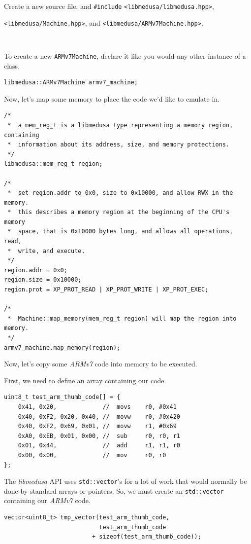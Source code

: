 \documentclass{report}
\begin{document}
	Create a new source file, and \texttt{\#include}
	\texttt{<libmedusa/libmedusa.hpp>}, \

	\texttt{<libmedusa/Machine.hpp>}, and \texttt{<libmedusa/ARMv7Machine.hpp>}.
	\
	
	\

	To create a new \texttt{ARMv7Machine}, declare it like you would any other
	instance of a class.

	\begin{lstlisting}
libmedusa::ARMv7Machine armv7_machine;
	\end{lstlisting}

	Now, let's map some memory to place the code we'd like to emulate in.

	\begin{lstlisting}
/*
 *  a mem_reg_t is a libmedusa type representing a memory region, containing
 *  information about its address, size, and memory protections.
 */
libmedusa::mem_reg_t region;

/*
 *  set region.addr to 0x0, size to 0x10000, and allow RWX in the memory.
 *  this describes a memory region at the beginning of the CPU's memory
 *  space, that is 0x10000 bytes long, and allows all operations, read,
 *  write, and execute.
 */
region.addr = 0x0;
region.size = 0x10000;
region.prot = XP_PROT_READ | XP_PROT_WRITE | XP_PROT_EXEC;

/*
 *  Machine::map_memory(mem_reg_t region) will map the region into memory.
 */
armv7_machine.map_memory(region);
\end{lstlisting}

	Now, let's copy some \textit{ARMv7} code into memory to be executed.

	First, we need to define an array containing our code.

	\begin{lstlisting}
uint8_t test_arm_thumb_code[] = {
	0x41, 0x20,				//	movs	r0,	#0x41
	0x40, 0xF2, 0x20, 0x40,	//	movw	r0,	#0x420
	0x40, 0xF2, 0x69, 0x01,	//	movw	r1,	#0x69
	0xA0, 0xEB, 0x01, 0x00,	//	sub		r0,	r0,	r1
	0x01, 0x44,				//	add		r1,	r1,	r0
	0x00, 0x00,				//  mov		r0,	r0
};
	\end{lstlisting}

	The \textit{libmedusa} API uses \texttt{std::vector}'s for a lot of work
	that would normally be done by standard arrays or pointers. So, we must
	create an \texttt{std::vector} containing our \textit{ARMv7} code.

	\begin{lstlisting}
vector<uint8_t> tmp_vector(test_arm_thumb_code,
						   test_arm_thumb_code
						 + sizeof(test_arm_thumb_code));
	\end{lstlisting}
\end{document}
